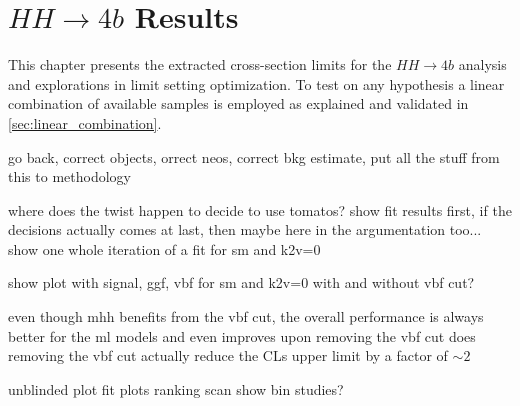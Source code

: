 \chapter{$HH\rightarrow 4b$ Results}\label{ch:hh4b-results}

This chapter presents the extracted cross-section limits for the $HH\rightarrow 4b$ analysis and explorations in limit setting optimization. To test on any \ktwov hypothesis a linear combination of available samples is employed as explained and validated in \ref{sec:linear_combination}.




\begin{landscape}
    \begin{figure}
        \centering
        \caption[]{}
        \label{fig:k2v_scan_limits_overlay}
    \end{figure}
\end{landscape}


go back, correct objects,  orrect neos, correct bkg estimate, put all the stuff from this to methodology



where does the twist happen to decide to use tomatos? show fit results first, if the decisions actually comes at last, then maybe here in the argumentation too...
show one whole iteration of a fit for sm and k2v=0

show plot with signal, ggf, vbf for sm and k2v=0 with and without vbf cut?

even though mhh benefits from the vbf cut, the overall performance is always better for the \ac{ml} models and even improves upon removing the vbf cut
does removing the vbf cut actually reduce the CLs upper limit by a factor of $\sim 2$

unblinded plot
fit plots
ranking
scan
show bin studies?


